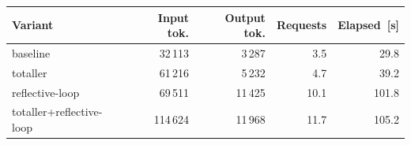 \begin{tabular}{lrrrr}
\toprule
Variant & Input tok. & Output tok. & Requests & Elapsed~[s] \\
\midrule
baseline & 32\,113 & 3\,287 & 3.5 & 29.8 \\
totaller & 61\,216 & 5\,232 & 4.7 & 39.2 \\
reflective-loop & 69\,511 & 11\,425 & 10.1 & 101.8 \\
totaller+reflective-loop & 114\,624 & 11\,968 & 11.7 & 105.2 \\
\bottomrule
\end{tabular}
